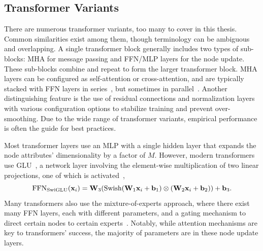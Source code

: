 
\subsection{Transformer Variants}
\label{sec:transformer_variants}

There are numerous transformer variants, too many to cover in this thesis.
Common similarities exist among them, though terminology can be ambiguous and overlapping.
A single transformer block generally includes two types of sub-blocks: \Gls{MHA} for message passing and \Gls{FFN}/\Gls{MLP} layers for the node update.
These sub-blocks combine and repeat to form the larger transformer block.
\Gls{MHA} layers can be configured as self-attention or cross-attention, and are typically stacked with FFN layers in series~\cite{Attention}, but sometimes in parallel~\cite{Palm}.
Another distinguishing feature is the use of residual connections and normalization layers with various configuration options to stabilize training and prevent over-smoothing.
Due to the wide range of transformer variants, empirical performance is often the guide for best practices.

Most transformer layers use an \Gls{MLP} with a single hidden layer that expands the node attributes' dimensionality by a factor of $M$.
However, modern transformers use \Gls{GLU}~\cite{GLU}, a network layer involving the element-wise multiplication of two linear projections, one of which is activated~\cite{SwiGLU},
\begin{equation}
    \text{FFN}_\text{SwiGLU}(\mathbf{x}_i) = \mathbf{W}_3(\text{Swish}(\mathbf{W}_1 \mathbf{x}_i + \mathbf{b}_1) \otimes (\mathbf{W}_2 \mathbf{x}_i + \mathbf{b}_2)) + \mathbf{b}_3.
\end{equation}
Many transformers also use the mixture-of-experts approach, where there exist many FFN layers, each with different parameters, and a gating mechanism to direct certain nodes to certain experts~\cite{MOE}.
Notably, while attention mechanisms are key to transformers' success, the majority of parameters are in these node update layers.

